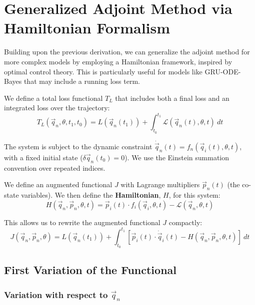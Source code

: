 \section{Generalized Adjoint Method via Hamiltonian Formalism}
\label{app:hamiltonian_adjoint}

Building upon the previous derivation, we can generalize the adjoint method for more complex
models by employing a Hamiltonian framework, inspired by optimal control theory. 
This is particularly useful for models like GRU-ODE-Bayes that may include a running loss term.

We define a total loss functional $T_L$ that includes both a final loss and an integrated loss over the trajectory:
\begin{equation}
    T_L(\vec{q}_n, \theta, t_1, t_0) = L(\vec{q}_n(t_1)) + \int_{t_0}^{t_1} \mathcal{L}(\vec{q}_n(t), \theta, t)\ dt
    \label{eq:total_loss}
\end{equation}

The system is subject to the dynamic constraint $\dot{\vec{q}}_n(t) = f_n(\vec{q}_i(t), \theta, t)$, 
with a fixed initial state ($\delta\vec{q}_n(t_0) = 0$). 
We use the Einstein summation convention over repeated indices.

We define an augmented functional $J$ with Lagrange multipliers $\vec{p}_n(t)$ (the co-state variables).
We then define the \textbf{Hamiltonian}, $H$, for this system:
\begin{equation}
    H(\vec{q}_n, \vec{p}_n, \theta, t) = \vec{p}_i(t) \cdot f_i(\vec{q}_i, \theta, t) - \mathcal{L}(\vec{q}_n, \theta, t)
    \label{eq:hamiltonian_def}
\end{equation}

This allows us to rewrite the augmented functional $J$ compactly:
\begin{equation}
    J(\vec{q}_n, \vec{p}_n, \theta)  = L(\vec{q}_n(t_1))
    + \int_{t_0}^{t_1} \left[
    \vec{p}_i(t) \cdot \dot{\vec{q}}_i(t) -  H(\vec{q}_n, \vec{p}_n, \theta, t)
    \right]\ dt
    \label{eq:hamiltonian_functional}
\end{equation}

\subsection{First Variation of the Functional}

\subsubsection{Variation with respect to $\vec{q}_n$}

